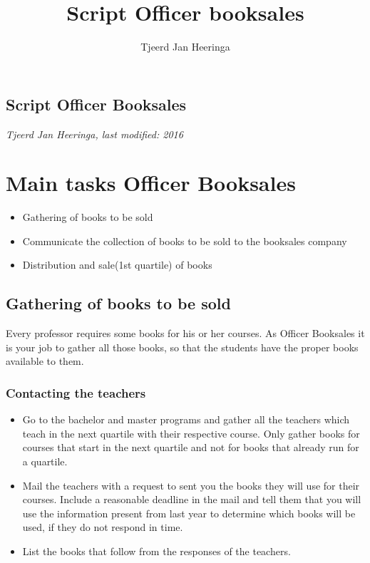 \documentclass{article}
\title{Script Officer booksales}
\author{Tjeerd Jan Heeringa}
\begin{document}
\begin{center}

\section*{Script Officer Booksales}
\vspace{-3mm}
\textit{Tjeerd Jan Heeringa, last modified: 2016}
\end{center}


\section*{Main tasks Officer Booksales}
\begin{itemize}
\vspace{-1mm}
\itemsep-1mm
\item Gathering of books to be sold
\item Communicate the collection of books to be sold to the booksales company
\item Distribution and sale(1st quartile) of books
\end{itemize}


\subsection*{Gathering of books to be sold}
Every professor requires some books for his or her courses. As Officer Booksales it is your job to gather all those books, so that the students have the proper books available to them.  

\subsubsection*{Contacting the teachers}

\begin{itemize} 
\vspace{-1mm}
\itemsep-1mm 
\item Go to the bachelor and master programs and gather all the teachers which teach in the next quartile with their respective course. Only gather books for courses that start in the next quartile and not for books that already run for a quartile.
\item Mail the teachers with a request to sent you the books they will use for their courses. Include a reasonable deadline in the mail and tell them that you will use the information present from last year to determine which books will be used, if they do not respond in time.
\item List the books that follow from the responses of the teachers.
\end{itemize}
\end{document}
